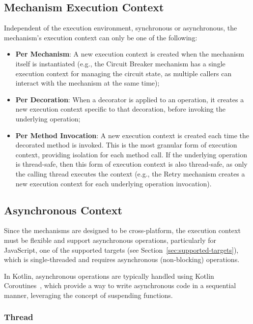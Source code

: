\subsection{Mechanism Execution Context}\label{subsec:mechanism-execution-context}

Independent of the execution environment, synchronous or asynchronous, the mechanism's execution context can only be one of the following:

\begin{itemize}
    \item \textbf{Per Mechanism}: A new execution context is created when the mechanism itself is instantiated (e.g., the Circuit Breaker mechanism has a single execution context for managing the circuit state, as multiple callers can interact with the mechanism at the same time);
    \item \textbf{Per Decoration}: When a decorator is applied to an operation, it creates a new execution context specific to that decoration, before invoking the underlying operation;
    \item \textbf{Per Method Invocation}: A new execution context is created each time the decorated method is invoked.
    This is the most granular form of execution context, providing isolation for each method call.
    If the underlying operation is thread-safe, then this form of execution context is also thread-safe, as only the calling thread executes the context (e.g., the Retry mechanism creates a new execution context for each underlying operation invocation).
\end{itemize}

\subsection{Asynchronous Context}\label{subsec:asynchronous-context}

Since the mechanisms are designed to be cross-platform, the execution context must be flexible and support asynchronous operations, particularly for JavaScript, one of the supported targets (see Section~\ref{sec:supported-targets}), which is single-threaded and requires asynchronous (non-blocking) operations.

In Kotlin, asynchronous operations are typically handled using Kotlin Coroutines~\cite{kotlin-coroutines}, which provide a way to write asynchronous code in a sequential manner, leveraging the concept of suspending functions.

\subsubsection{Thread}\label{subsubsec:thread}

